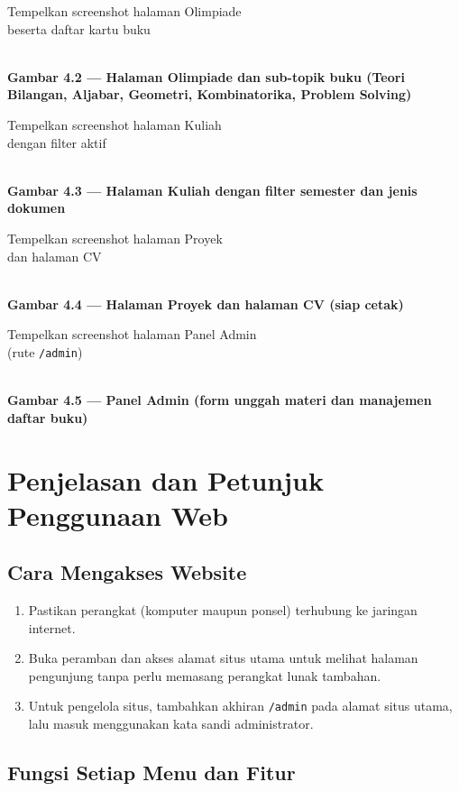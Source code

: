 \documentclass[12pt,a4paper]{article}
\newcommand{\captiongambar}{}
\newenvironment{kotakgambar}[1]{%
	\renewcommand{\captiongambar}{#1}%
	\begin{lrbox}{\kotakbox}%
		\begin{minipage}[c][5cm][c]{0.9\textwidth}%
			\centering\color{gray}\small
		}{%
		\end{minipage}%
	\end{lrbox}%
	\begin{center}
		\fbox{\usebox{\kotakbox}}\\[4pt]
		\small\textbf{\captiongambar}
	\end{center}
}
\begin{document}
	\begin{kotakgambar}{Gambar 4.2 --- Halaman Olimpiade dan sub-topik buku (Teori Bilangan, Aljabar, Geometri, Kombinatorika, Problem Solving)}
		Tempelkan screenshot halaman Olimpiade\\ beserta daftar kartu buku
	\end{kotakgambar}
	
	\begin{kotakgambar}{Gambar 4.3 --- Halaman Kuliah dengan filter semester dan jenis dokumen}
		Tempelkan screenshot halaman Kuliah\\ dengan filter aktif
	\end{kotakgambar}
	
	\begin{kotakgambar}{Gambar 4.4 --- Halaman Proyek dan halaman CV (siap cetak)}
		Tempelkan screenshot halaman Proyek\\ dan halaman CV
	\end{kotakgambar}
	
	\begin{kotakgambar}{Gambar 4.5 --- Panel Admin (form unggah materi dan manajemen daftar buku)}
		Tempelkan screenshot halaman Panel Admin\\ (rute \texttt{/admin})
	\end{kotakgambar}
	
	\section{Penjelasan dan Petunjuk Penggunaan Web}
	
	\subsection{Cara Mengakses Website}
	
	\begin{enumerate}[leftmargin=*]
		\item Pastikan perangkat (komputer maupun ponsel) terhubung ke jaringan internet.
		\item Buka peramban dan akses alamat situs utama untuk melihat halaman pengunjung tanpa perlu memasang perangkat lunak tambahan.
		\item Untuk pengelola situs, tambahkan akhiran \texttt{/admin} pada alamat situs utama, lalu masuk menggunakan kata sandi administrator.
	\end{enumerate}
	
	\subsection{Fungsi Setiap Menu dan Fitur}
	
\end{document}

